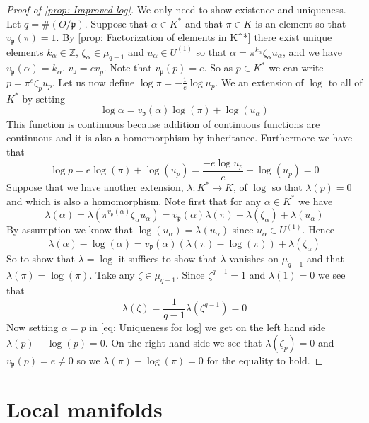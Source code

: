 \documentclass{article}
\newcommand{\mfrak}[1]{\mathfrak{#1}}
\newcommand{\mbb}[1]{\mathbb{#1}}
\numberwithin{equation}{section}
\begin{document}
\begin{proof}[Proof of \cref{prop: Improved log}]
    We only need to show existence and uniqueness. Let $q = \#(O / \mfrak p)$. Suppose that $\alpha \in K^*$ and that $\pi \in K$ is an element so that $v_\mfrak p(\pi) = 1$. By \cref{prop: Factorization of elements in K^*} there exist unique elements $k_\alpha \in \mbb Z$, $\zeta_\alpha \in \mu_{q-1}$ and $u_\alpha \in U^{(1)}$ so that $\alpha = \pi^{k_\alpha} \zeta_\alpha u_\alpha$, and we have $v_\mfrak p(\alpha) = k_\alpha$.
    $v_\mfrak p = e v_p$. Note that $v_{\mfrak p} (p) = e$. So as $p \in K^*$ we can write $p = \pi^{e}\zeta_p u_p$. Let us now define $\log \pi = -\frac{1}{e}\log u_p$. We an extension of $\log$ to all of $K^*$ by setting
    $$\log \alpha = v_\mfrak p(\alpha)\log(\pi) + \log(u_\alpha)$$
    This function is continuous because addition of continuous functions are continuous and it is also a homomorphism by inheritance. Furthermore we have that
    $$\log p = e\log(\pi) + \log(u_p) = \frac{-e\log u_p}{e} + \log(u_p) = 0 $$
    Suppose that we have another extension, $\lambda : K^* \to K$, of $\log$ so that $\lambda(p) = 0$ and which is also a homomorphism. Note first that for any $\alpha \in K^*$ we have
    $$\lambda(\alpha) = \lambda(\pi^{v_\mfrak p(\alpha)}\zeta_\alpha u_\alpha) = {v_\mfrak p(\alpha)}\lambda(\pi) + \lambda(\zeta_\alpha) + \lambda(u_\alpha)$$
    By assumption we know that $\log(u_\alpha) = \lambda(u_\alpha)$ since $u_\alpha \in U^{(1)}$. Hence
    \begin{equation}\label{eq: Uniqueness for log}
        \lambda(\alpha) - \log(\alpha) = {v_\mfrak p(\alpha)}(\lambda(\pi)-\log(\pi))  + \lambda(\zeta_\alpha)
    \end{equation}
    So to show that $\lambda = \log$ it suffices to show that $\lambda$ vanishes on $\mu_{q-1}$ and that $\lambda(\pi) = \log(\pi)$. Take any $\zeta \in \mu_{q-1}$. Since $\zeta^{q-1} = 1$ and $\lambda(1) = 0$ we see that
    $$\lambda(\zeta) = \frac{1}{q-1}\lambda(\zeta^{q-1}) = 0$$
    Now setting $\alpha = p$ in \cref{eq: Uniqueness for log} we get on the left hand side $\lambda(p) - \log(p) = 0$. On the right hand side we see that $\lambda(\zeta_p) = 0$ and $v_\mfrak p(p) = e \neq 0$ so we $\lambda(\pi) - \log(\pi) = 0$ for the equality to hold.
\end{proof}

\section{Local manifolds}
 
\end{document}
